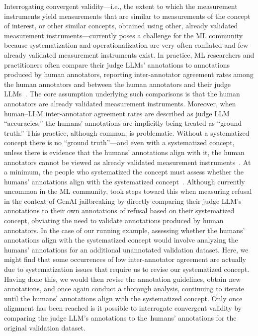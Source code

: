 \documentclass{article}
\begin{document}
Interrogating convergent validity---i.e., the extent to which the measurement instruments yield measurements that are similar to measurements of the concept of interest, or other similar concepts, obtained using other, already validated measurement instruments---currently poses a challenge for the ML community because systematization and operationalization are very often conflated and few already validated measurement instruments exist. In practice, ML researchers and practitioners often compare their judge LLMs' annotations to annotations produced by human annotators, reporting inter-annotator agreement rates among the human annotators and between the human annotators and their judge LLMs~\cite{gu2024survey}. The core assumption underlying such comparisons is that the human annotators are already validated measurement instruments. Moreover, when human--LLM inter-annotator agreement rates are described as judge LLM ``accuracies,'' the humans' annotations are implicitly being treated as ``ground truth.'' This practice, although common, is problematic. 
Without a systematized concept there is no ``ground truth''---and even with a systematized concept, unless there is evidence that the humans' annotations align with it, the human annotators cannot be viewed as already validated measurement instruments~\citep{mikhaylov2012coder}. At a minimum, the people who systematized the concept must assess whether the humans' annotations align with the systematized concept~\citep{halterman2024codebook}.  
Although currently uncommon in the ML community, \citet{yu2023gptfuzzer} took steps toward this when measuring refusal in the context of GenAI jailbreaking by directly comparing their judge LLM's annotations to their own annotations of refusal based on their systematized concept, obviating the need to validate annotations produced by human annotators. 
In the case of our running example, assessing whether the humans' annotations align with the systematized concept would involve analyzing the humans' annotations for an additional unannotated validation dataset. Here, we might find that some occurrences of low inter-annotator agreement are actually due to systematization issues that require us to revise our systematized concept. Having done this, we would then revise the annotation guidelines, obtain new annotations, and once again conduct a thorough analysis, continuing to iterate until the humans' annotations align with the systematized concept. Only once alignment has been reached is it possible to interrogate convergent validity by comparing the judge LLM's annotations to the~humans' annotations for the original validation dataset.  
\end{document}
